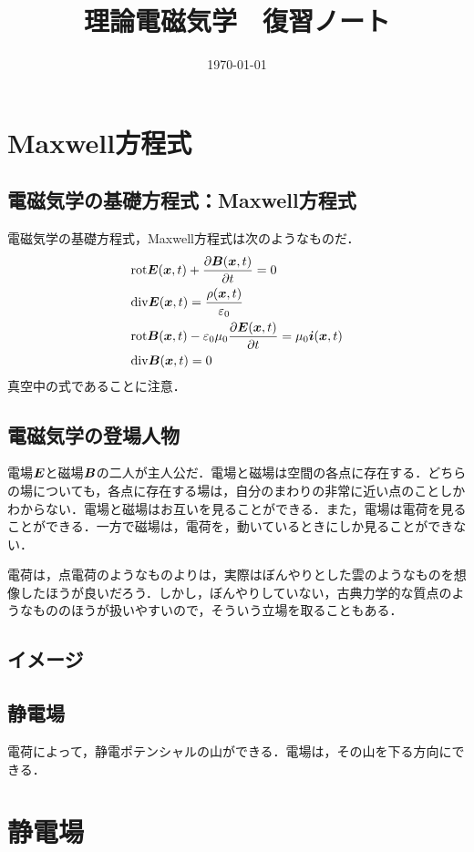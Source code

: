 \documentclass[a4paper,10pt,uplatex]{jsarticle}
\newcommand{\rot}{\mathrm{rot}}
\renewcommand{\div}{\mathrm{div}}
\newcommand{\E}{\vb*{E}}
\newcommand{\B}{\vb*{B}}
\newcommand{\x}{\vb*{x}}
\renewcommand{\i}{\vb*{i}}
\begin{document}
\title{理論電磁気学　復習ノート}
\author{}
\date{\today}
\maketitle

\section{Maxwell方程式}
\subsection{電磁気学の基礎方程式：Maxwell方程式}
電磁気学の基礎方程式，Maxwell方程式は次のようなものだ．
\begin{align}
    &\rot \E(\x,t) + \pdv{\B(\x,t)}{t} = 0 \\
    &\div \E(\x,t) = \frac{\rho(\x, t)}{\varepsilon_0} \\
    &\rot \B(\x,t) - \varepsilon_0\mu_0\pdv{\E(\x,t)}{t} = \mu_0\i(\x,t) \\
    &\div \B(\x,t) = 0
\end{align}
真空中の式であることに注意．

\subsection{電磁気学の登場人物}
電場$\E$と磁場$\B$の二人が主人公だ．電場と磁場は空間の各点に存在する．どちらの場についても，各点に存在する場は，自分のまわりの非常に近い点のことしかわからない．電場と磁場はお互いを見ることができる．また，電場は電荷を見ることができる．一方で磁場は，電荷を，動いているときにしか見ることができない．%

電荷は，点電荷のようなものよりは，実際はぼんやりとした雲のようなものを想像したほうが良いだろう．しかし，ぼんやりしていない，古典力学的な質点のようなもののほうが扱いやすいので，そういう立場を取ることもある．

\subsection{イメージ}
\subsection{静電場}
電荷によって，静電ポテンシャルの山ができる．電場は，その山を下る方向にできる．

\section{静電場}
\end{document}
